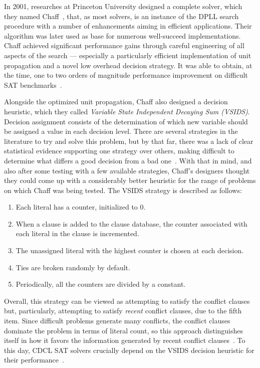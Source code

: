 In 2001, researches at Princeton University designed a complete solver, which
they named Chaff~\cite{moskewicz2001chaff}, that, as most solvers, is an
instance of the DPLL search procedure with a number of enhancements aiming in
efficient applications.  Their algorithm was later used as base for numerous
well-succeed implementations. Chaff achieved significant performance gains
through careful engineering of all aspects of the search --- especially a
particularly efficient implementation of unit propagation and a novel low
overhead decision strategy.  It was able to obtain, at the time, one to two
orders of magnitude performance improvement on difficult SAT
benchmarks~\cite{moskewicz2001chaff}.

Alongside the optimized unit propagation, Chaff also designed a decision
heuristic, which they called \emph{Variable State Independent Decaying Sum
(VSIDS)}. Decision assignment consists of the determination of which new
variable should be assigned a value in each decision level. There are several
strategies in the literature to try and solve this problem, but by that far,
there was a lack of clear statistical evidence supporting one strategy over
others, making difficult to determine what differs a good decision from a bad
one~\cite{moskewicz2001chaff}. With that in mind, and also after some testing
with a few available strategies, Chaff's designers thought they could come up
with a considerably better heuristic for the range of problems on which Chaff
was being tested. The VSIDS strategy is described as follows:

\begin{enumerate}
    \item Each literal has a counter, initialized to 0.
    \item When a clause is added to the clause database, the counter associated with
        each literal in the clause is incremented.
    \item The unassigned literal with the highest counter is chosen at each
        decision.
    \item Ties are broken randomly by default.
    \item Periodically, all the counters are divided by a constant.
\end{enumerate}

Overall, this strategy can be viewed as attempting to satisfy the conflict
clauses but, particularly, attempting to satisfy \emph{recent} conflict clauses,
due to the fifth item. Since difficult problems generate many conflicts, the
conflict clauses dominate the problem in terms of literal count, so this
approach distinguishes itself in how it favors the information generated by
recent conflict clauses~\cite{moskewicz2001chaff}. To this day, CDCL SAT solvers
crucially depend on the VSIDS decision heuristic for their
performance~\cite{vsidsincdcl}. 

